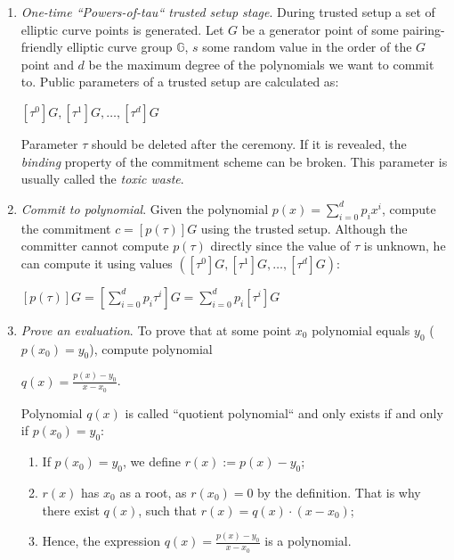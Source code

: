 \documentclass[../lecture-notes.tex]{subfiles}
\begin{document}
\begin{enumerate}
    \item \textit{One-time ``Powers-of-tau`` trusted setup stage}. During trusted setup a set of elliptic curve points is generated. 
    Let $G$ be a generator point of some pairing-friendly
    elliptic curve group $\mathbb{G}$, $s$ some random value in the order of the $G$ point and $d$ be the maximum degree 
    of the polynomials we want to commit to.
    Public parameters of a trusted setup are calculated as:

    \begin{center}
        $[\tau^0]G, [\tau^1]G, \ldots, [\tau^d]G$
    \end{center}

    Parameter $\tau$ should be deleted after the ceremony. If it is revealed, the \textit{binding} property of the commitment scheme can be broken. 
    This parameter is usually called the \textit{toxic waste}.
    
    \item \textit{Commit to polynomial}. Given the polynomial $p(x) = \sum_{i = 0}^{d} p_i x^i$, compute the commitment $c = [p(\tau)]G $ 
    using the trusted setup. Although the committer cannot compute $p(\tau)$ directly since the value of $\tau$ is unknown, he can
    compute it using values $([\tau^0]G, [\tau^1]G, \ldots, [\tau^d]G)$:
    
    \begin{center}
       $ [p(\tau)]G = [\sum_{i=0}^{d} p_i \tau^i]G = \sum_{i=0}^{d}p_i[\tau^i]G$
    \end{center}
    
    \item \textit{Prove an evaluation}. To prove that at some point $x_0$ polynomial equals $y_0$ ($p(x_0) = y_0$), compute polynomial
    
    \begin{center}
        $q(x) = \frac{p(x) - y_0}{x - x_0}$.
    \end{center}

    Polynomial $q(x)$ is called ``quotient polynomial`` and only exists if and only if $p(x_0) = y_0$:
    \begin{enumerate}
        \item If $p(x_0) = y_0$, we define $r(x) := p(x) - y_0$;
        \item $r(x)$ has $x_0$ as a root, as $r(x_0) = 0$ by the definition. 
            That is why there exist $q(x)$, such that $r(x) = q(x)\cdot (x-x_0)$;
        \item Hence, the expression $q(x) = \frac{p(x) - y_0}{x-x_0}$ is a polynomial.
    \end{enumerate}
    

\end{enumerate}
\end{document}
